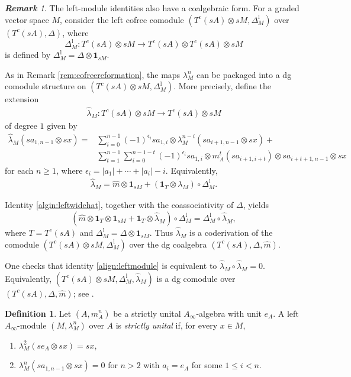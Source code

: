 \documentclass[a4paper, 11pt]{amsart}
\theoremstyle{definition}
\newtheorem{defn}[thm]{Definition}
\theoremstyle{remark}
\newtheorem{rem}[thm]{\bf Remark}
\numberwithin{equation}{section}
\newcommand{\LL}{\mathrm{l}}
\newcommand{\id}{\mathbf{1}}
\begin{document}
\begin{rem}
The left-module identities also have a coalgebraic form. For a graded vector space $M$, consider the left cofree comodule $(T^c(sA)\otimes sM,\Delta_M^{\LL})$ over $(T^c(sA),\Delta)$, where
\[
\Delta_M^{\LL}\colon T^c(sA)\otimes sM\to T^c(sA)\otimes T^c(sA)\otimes sM
\]
is defined by $\Delta_M^{\LL}=\Delta\otimes \mathbf 1_{sM}$.

As in Remark \ref{rem:cofreereformation}, the maps $\lambda_M^n$ can be packaged into a dg comodule structure on $(T^c(sA)\otimes sM,\Delta_M^{\LL})$. More precisely, define the extension
\begin{align}
\widehat \lambda_M \colon T^c(sA) \otimes sM \to T^c(sA) \otimes sM
\end{align}
of degree $1$ given by
\begin{align*}
\widehat \lambda_M (sa_{1,n-1} \otimes sx) ={} & \sum_{i=0}^{n-1} (-1)^{\epsilon_i} sa_{1,i} \otimes \lambda_M^{n-i}(sa_{i+1, n-1}\otimes sx)+ \\
& \sum_{t=1}^{n-1}\sum_{i=0}^{n-1-t} (-1)^{\epsilon_i} sa_{1,i}\otimes m_A^t(sa_{i+1, i+t}) \otimes sa_{i+t+1, n-1}\otimes sx
\end{align*}
for each $n\geq 1$, where $\epsilon_i=|a_1|+\dotsb+|a_i|-i$.
Equivalently,
\begin{align}\label{algin:leftwidehat}
\widehat \lambda_M = \widehat m \otimes \id_{sM} + (\id_{T} \otimes \lambda_M) \circ \Delta^{\LL}_M.
\end{align}

Identity \eqref{algin:leftwidehat}, together with the coassociativity of $\Delta$, yields $$(\widehat{m} \otimes \mathbf 1_T \otimes \mathbf 1_{sM} + \mathbf 1_T \otimes \widehat \lambda_M)\circ \Delta^{\LL}_M = \Delta^{\LL}_M \circ \widehat \lambda_M,$$ where $T=T^c(sA)$ and $\Delta^{\LL}_M=\Delta \otimes \id_{sM}$. Thus $\widehat\lambda_M$ is a coderivation of the comodule $(T^c(sA)\otimes sM,\Delta_M^{\LL})$ over the dg coalgebra $(T^c(sA),\Delta,\widehat m)$.

One checks that identity \eqref{align:leftmodule} is equivalent to $\widehat\lambda_M\circ \widehat\lambda_M=0$. Equivalently, $(T^c(sA)\otimes sM,\Delta_M^{\LL},\widehat\lambda_M)$ is a dg comodule over $(T^c(sA),\Delta,\widehat m)$; see \cite[Section 3]{Kel01a}.
\end{rem}


\begin{defn}\label{defn:unitalleft}
Let $(A, m_A^n)$ be a strictly unital $A_{\infty}$-algebra with unit $e_A$. A left $A_{\infty}$-module $(M,\lambda_M^n)$ over $A$ is {\it strictly unital} if, for every $x\in M$,
\begin{enumerate}
\item $\lambda_M^2(se_A \otimes sx)=sx$,
\item $\lambda_M^n(sa_{1, n-1} \otimes sx) = 0$ for $n > 2$ with $a_i=e_A$ for some $1\leq i <n$.
\end{enumerate}
\end{defn}
\end{document}
